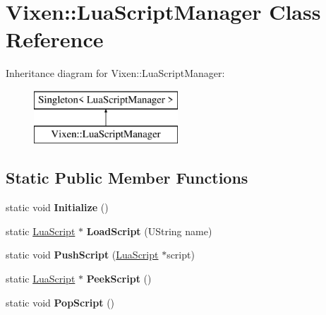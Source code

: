\hypertarget{class_vixen_1_1_lua_script_manager}{}\section{Vixen\+:\+:Lua\+Script\+Manager Class Reference}
\label{class_vixen_1_1_lua_script_manager}
Inheritance diagram for Vixen\+:\+:Lua\+Script\+Manager\+:\begin{figure}[H]
\begin{center}
\leavevmode
\includegraphics[height=2.000000cm]{class_vixen_1_1_lua_script_manager}
\end{center}
\end{figure}
\subsection*{Static Public Member Functions}
\begin{DoxyCompactItemize}
\item 
\hypertarget{class_vixen_1_1_lua_script_manager_a0b766acec3de0b94b946ae51a9f32e37}{}static void {\bfseries Initialize} ()\label{class_vixen_1_1_lua_script_manager_a0b766acec3de0b94b946ae51a9f32e37}

\item 
\hypertarget{class_vixen_1_1_lua_script_manager_adb3ab8c19fb3094c6989e2abbc74b9f9}{}static \hyperlink{class_vixen_1_1_lua_script}{Lua\+Script} $\ast$ {\bfseries Load\+Script} (U\+String name)\label{class_vixen_1_1_lua_script_manager_adb3ab8c19fb3094c6989e2abbc74b9f9}

\item 
\hypertarget{class_vixen_1_1_lua_script_manager_a93c5bd41074d7710b02d249e687631e6}{}static void {\bfseries Push\+Script} (\hyperlink{class_vixen_1_1_lua_script}{Lua\+Script} $\ast$script)\label{class_vixen_1_1_lua_script_manager_a93c5bd41074d7710b02d249e687631e6}

\item 
\hypertarget{class_vixen_1_1_lua_script_manager_a82c18d10a2aa568e7ea04a53f8f284ad}{}static \hyperlink{class_vixen_1_1_lua_script}{Lua\+Script} $\ast$ {\bfseries Peek\+Script} ()\label{class_vixen_1_1_lua_script_manager_a82c18d10a2aa568e7ea04a53f8f284ad}

\item 
\hypertarget{class_vixen_1_1_lua_script_manager_a39af8ff2aba63b2fe16aeb8b4fc09099}{}static void {\bfseries Pop\+Script} ()\label{class_vixen_1_1_lua_script_manager_a39af8ff2aba63b2fe16aeb8b4fc09099}

\end{DoxyCompactItemize}
